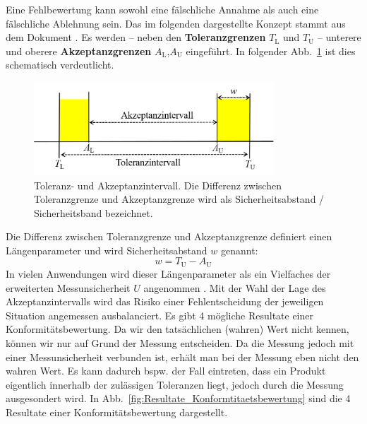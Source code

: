 Eine Fehlbewertung kann sowohl eine fälschliche Annahme als auch eine fälschliche Ablehnung sein. Das im folgenden dargestellte Konzept stammt aus dem Dokument \cite{JCGM106}. Es werden -- neben den \textbf{Toleranzgrenzen} $T_\mathrm{L}$ und $T_\mathrm{U}$ -- unterere und oberere \textbf{Akzeptanzgrenzen} $A_\mathrm{L}$,\;$A_\mathrm{U}$ eingeführt.
In folgender Abb.~\ref{fig:Toleranz_Akzeptanzintervall} ist dies schematisch verdeutlicht.
\begin{figure}[!htp]
	\begin{center}
		\includegraphics[width=90mm]{05_vorlesung/media/Toleranz_Akzeptanzintervall.png}
		\caption{\label{fig:Toleranz_Akzeptanzintervall} Toleranz- und Akzeptanzintervall. Die Differenz zwischen Toleranzgrenze und Akzeptanzgrenze wird als Sicherheitsabstand / Sicherheitsband bezeichnet.}
	\end{center}
\end{figure}
Die Differenz zwischen Toleranzgrenze und Akzeptanzgrenze definiert einen Längenparameter und wird Sicherheitsabstand $w$ genannt:
\begin{equation}
	w= 	T_\mathrm{U} - A_\mathrm{U}
\end{equation}
In vielen Anwendungen wird dieser Längenparameter als ein Vielfaches der erweiterten Messunsicherheit $U$ angenommen \cite{JCGM106}.
Mit der Wahl der Lage des Akzeptanzintervalls wird das Risiko einer Fehlentscheidung der jeweiligen Situation angemessen ausbalanciert. Es gibt 4 mögliche Resultate einer Konformitätsbewertung. Da wir den tatsächlichen (\glqq wahren\grqq) Wert nicht kennen,
können wir nur auf Grund der Messung entscheiden. Da die Messung jedoch mit einer Messunsicherheit verbunden ist, erhält man bei der Messung eben nicht den wahren Wert.
Es kann dadurch bspw. der Fall eintreten, dass ein Produkt eigentlich innerhalb der zulässigen Toleranzen liegt, jedoch durch die Messung ausgesondert wird. In Abb.~\ref{fig:Resultate_Konformtitaetsbewertung} sind die 4 Resultate einer Konformitätsbewertung dargestellt.

